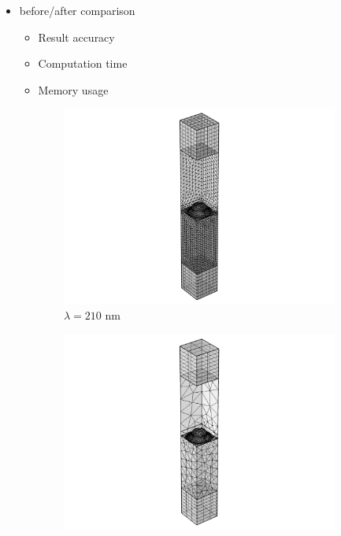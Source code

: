 \begin{itemize}
    \item before/after comparison 
    \begin{itemize}
        \item Result accuracy
        \item Computation time
        \item Memory usage
    \end{itemize}
\end{itemize}

\begin{figure}[htb]
    \centering
    \begin{subfigure}{.2\textwidth}
        \centering
        \includegraphics[scale=0.4, trim=12cm 0cm 12cm 0cm, clip]{figures/ch4/Mesh_210nm_hair=hsub=500_PMLheight=250_current.png}
        \caption{$\lambda=210$ nm}
        \label{fig:meshDomainHeight_a}
    \end{subfigure}%
    \begin{subfigure}{.2\textwidth}
        \centering %
        \includegraphics[scale=0.4, trim=12cm 0cm 12cm 0cm, clip]{figures/ch4/Mesh_800nm_hair=hsub=500_PMLheight=250_current.png}

\end{subfigure}
\end{figure}
